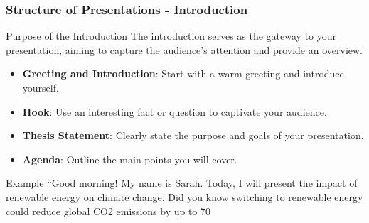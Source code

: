 \documentclass[aspectratio=169]{beamer}
\begin{document}
\begin{frame}[fragile]
    \frametitle{Structure of Presentations - Introduction}
    \begin{block}{Purpose of the Introduction}
        The introduction serves as the gateway to your presentation, aiming to capture the audience's attention and provide an overview.
    \end{block}
    
    \begin{itemize}
        \item \textbf{Greeting and Introduction}: Start with a warm greeting and introduce yourself.
        \item \textbf{Hook}: Use an interesting fact or question to captivate your audience.
        \item \textbf{Thesis Statement}: Clearly state the purpose and goals of your presentation.
        \item \textbf{Agenda}: Outline the main points you will cover.
    \end{itemize}
    
    \begin{block}{Example}
        “Good morning! My name is Sarah. Today, I will present the impact of renewable energy on climate change. Did you know switching to renewable energy could reduce global CO2 emissions by up to 70%
    \end{block}
\end{frame}
\end{document}
